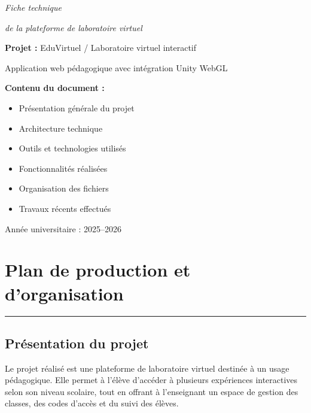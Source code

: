 \documentclass[12pt,a4paper]{report}
\newcommand{\sectionline}{
  \vspace{0.3em}
  \noindent\color{mainline}\rule{\textwidth}{1.5pt}
  \vspace{0.6em}
}
\begin{document}
\begin{titlepage}
  \centering
  \vspace*{2.5cm}

  {\Huge\itshape Fiche technique\par}
  \vspace{0.8cm}
  {\Large\itshape de la plateforme de laboratoire virtuel\par}

  \vspace{2.2cm}

  {\Large\textbf{Projet :} EduVirtuel / Laboratoire virtuel interactif\par}
  \vspace{0.4cm}
  {\large Application web pédagogique avec intégration Unity WebGL\par}

  \vfill

  \begin{flushleft}
    \textbf{Contenu du document :}
    \begin{itemize}[leftmargin=1.2cm]
      \item Présentation générale du projet
      \item Architecture technique
      \item Outils et technologies utilisés
      \item Fonctionnalités réalisées
      \item Organisation des fichiers
      \item Travaux récents effectués
    \end{itemize}
  \end{flushleft}

  \vfill

  {\large Année universitaire : 2025--2026\par}
\end{titlepage}

\chapter{Plan de production et d'organisation}

\sectionline

\section{Présentation du projet}

Le projet réalisé est une plateforme de laboratoire virtuel destinée à un usage pédagogique.
Elle permet à l'élève d'accéder à plusieurs expériences interactives selon son niveau
scolaire, tout en offrant à l'enseignant un espace de gestion des classes, des codes
d'accès et du suivi des élèves.
\end{document}
